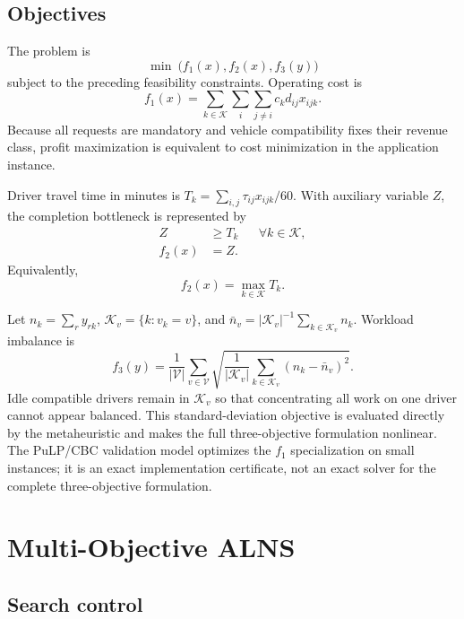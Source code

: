 \documentclass[11pt,a4paper]{article}
\newcommand{\K}{\mathcal{K}}
\newcommand{\V}{\mathcal{V}}
\begin{document}
\subsection{Objectives}

The problem is
\begin{equation}
 \min\ \bigl(f_1(x),f_2(x),f_3(y)\bigr)
\end{equation}
subject to the preceding feasibility constraints. Operating cost is
\begin{equation}
 f_1(x)=\sum_{k\in\K}\sum_i\sum_{j\ne i}c_kd_{ij}x_{ijk}.
\end{equation}
Because all requests are mandatory and vehicle compatibility fixes their
revenue class, profit maximization is equivalent to cost minimization in the
application instance.

Driver travel time in minutes is
$T_k=\sum_{i,j}\tau_{ij}x_{ijk}/60$. With auxiliary variable $Z$,
the completion bottleneck is represented by
\begin{align}
 Z&\ge T_k &&\forall k\in\K,\\
 f_2(x)&=Z.
\end{align}
Equivalently,
\begin{equation}
 f_2(x)=\max_{k\in\K}T_k.
\end{equation}

Let $n_k=\sum_ry_{rk}$, $\K_v=\{k:v_k=v\}$, and
$\bar n_v=|\K_v|^{-1}\sum_{k\in\K_v}n_k$. Workload imbalance is
\begin{equation}
 f_3(y)=\frac{1}{|\V|}\sum_{v\in\V}
 \sqrt{\frac{1}{|\K_v|}\sum_{k\in\K_v}(n_k-\bar n_v)^2}.
\end{equation}
Idle compatible drivers remain in $\K_v$ so that concentrating all work on one
driver cannot appear balanced. This standard-deviation objective is evaluated
directly by the metaheuristic and makes the full three-objective formulation
nonlinear. The PuLP/CBC validation model optimizes the $f_1$ specialization on
small instances; it is an exact implementation certificate, not an exact
solver for the complete three-objective formulation.

\section{Multi-Objective ALNS}

\subsection{Search control}
\end{document}
